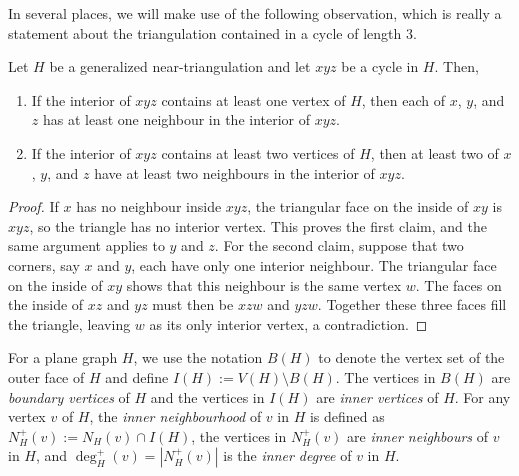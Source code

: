 \documentclass{patmorin}
\newcommand{\defin}[1]{\emph{\textcolor{brightmaroon}{#1}}}
\begin{document}
In several places, we will make use of the following observation, which is really a statement about the triangulation contained in a cycle of length $3$.
\begin{obs}\label{useful_little_guy}
  Let $H$ be a generalized near-triangulation and let $xyz$ be a cycle in $H$.  Then,
  \begin{enumerate}[label=\rm(\alph*),nosep,nolistsep]
    \item\label{useful_little_guy:1} If the interior of $xyz$ contains at least one vertex of $H$, then each of $x$, $y$, and $z$ has at least one neighbour in the interior of $xyz$.

    \item\label{useful_little_guy:2} If the interior of $xyz$ contains at least two vertices of $H$, then at least two of $x$, $y$, and $z$ have at least two neighbours in the interior of $xyz$.
  \end{enumerate}
\end{obs}
\begin{proof}
If $x$ has no neighbour inside $xyz$, the triangular face on the inside of
$xy$ is $xyz$, so the triangle has no interior vertex. This proves the first
claim, and the same argument applies to $y$ and $z$.
For the second claim, suppose that two corners, say $x$ and $y$, each have
only one interior neighbour. The triangular face on the inside of $xy$
shows that this neighbour is the same vertex $w$. The faces on the inside
of $xz$ and $yz$ must then be $xzw$ and $yzw$. Together these three faces
fill the triangle, leaving $w$ as its only interior vertex, a contradiction.
\end{proof}


For a plane graph $H$, we use the notation $B(H)$ to denote the vertex set of the outer face of $H$ and define $I(H):=V(H)\setminus B(H)$.  The vertices in $B(H)$ are \defin{boundary vertices} of $H$ and the vertices in $I(H)$ are \defin{inner vertices} of $H$. For any vertex $v$ of $H$, the \defin{inner neighbourhood} of $v$ in $H$ is defined as $N_H^+(v):=N_H(v)\cap I(H)$, the vertices in $N^+_H(v)$ are \defin{inner neighbours} of $v$ in $H$, and $\deg^+_H(v)=|N^+_H(v)|$ is the \defin{inner degree} of $v$ in $H$.
\end{document}
